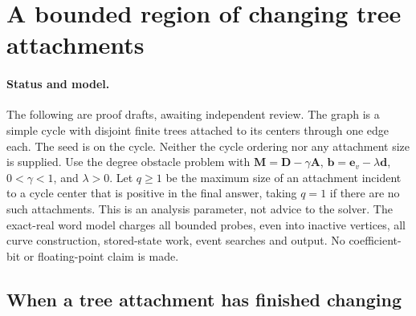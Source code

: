\section{A bounded region of changing tree attachments}
\label{sec:op3-bounded-attachments}

\paragraph{Status and model.}
The following are \statusproved{} proof drafts, awaiting independent review.
The graph is a simple cycle with disjoint finite trees attached to its
centers through one edge each. The seed is on the cycle. Neither the cycle
ordering nor any attachment size is supplied. Use the degree obstacle
problem with $\bm M=\bm D-\gamma\bm A$,
$\bm b=\bm e_v-\lambda\bm d$, $0<\gamma<1$, and $\lambda>0$.
Let $q\geq1$ be the maximum size of an attachment incident to a cycle
center that is positive in the final answer, taking $q=1$ if there are no
such attachments. This is an analysis parameter, not advice to the solver.
The exact-real word model charges all bounded probes, even into inactive
vertices, all curve construction, stored-state work, event searches and
output. No coefficient-bit or floating-point claim is made.

\subsection{When a tree attachment has finished changing}


